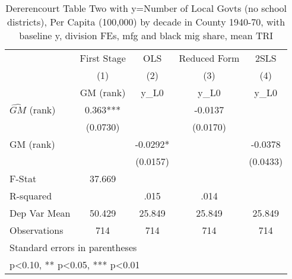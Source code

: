 \begin{table}[htbp]\centering
\def\sym#1{\ifmmode^{#1}\else\(^{#1}\)\fi}
\caption{Dererencourt Table Two with y=Number of Local Govts (no school districts), Per Capita (100,000) by decade in County 1940-70, with baseline y, division FEs, mfg and black mig share, mean TRI}
\begin{tabular}{l*{4}{c}}
\toprule
                    & First Stage   &         OLS   &Reduced Form   &        2SLS   \\
                    &\multicolumn{1}{c}{(1)}&\multicolumn{1}{c}{(2)}&\multicolumn{1}{c}{(3)}&\multicolumn{1}{c}{(4)}\\
                    &\multicolumn{1}{c}{GM  (rank)}&\multicolumn{1}{c}{y\_L0}&\multicolumn{1}{c}{y\_L0}&\multicolumn{1}{c}{y\_L0}\\
\midrule
$\hat{GM}$ (rank)   &       0.363***&               &     -0.0137   &               \\
                    &    (0.0730)   &               &    (0.0170)   &               \\
\addlinespace
GM  (rank)          &               &     -0.0292*  &               &     -0.0378   \\
                    &               &    (0.0157)   &               &    (0.0433)   \\
\midrule
F-Stat              &      37.669   &               &               &               \\
R-squared           &               &        .015   &        .014   &               \\
Dep Var Mean        &      50.429   &      25.849   &      25.849   &      25.849   \\
Observations        &         714   &         714   &         714   &         714   \\
\bottomrule
\multicolumn{5}{l}{\footnotesize Standard errors in parentheses}\\
\multicolumn{5}{l}{\footnotesize * p<0.10, ** p<0.05, *** p<0.01}\\
\end{tabular}
\end{table}
